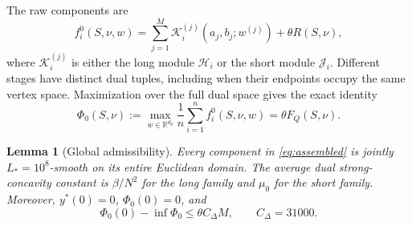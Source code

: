 \documentclass[11pt,letterpaper]{article}
\newtheorem{lemma}[theorem]{Lemma}
\theoremstyle{definition}
\theoremstyle{remark}
\begin{document}
The raw components are
\begin{equation}
 f_i^0(S,\nu,w)
   =\sum_{j=1}^M\mathcal K_i^{(j)}(a_j,b_j;w^{(j)})
       +\theta R(S,\nu),
 \label{eq:assembled}
\end{equation}
where $\mathcal K_i^{(j)}$ is either the long module
$\mathcal H_i$ or the short module $\mathcal J_i$.
Different stages have distinct dual tuples, including when their
endpoints occupy the same vertex space.
Maximization over the full dual space gives the exact identity
\begin{equation}
 \Phi_0(S,\nu)
 :=\max_{w\in\mathbb R^{d_y}}\frac1n\sum_{i=1}^n
                    f_i^0(S,\nu,w)
 =\theta F_Q(S,\nu).
 \label{eq:value-identity}
\end{equation}

\begin{lemma}[Global admissibility]
\label{lem:global-admissibility}
Every component in \eqref{eq:assembled} is jointly
$L_*=10^8$-smooth on its entire Euclidean domain.
The average dual strong-concavity constant is $\beta/N^2$ for the long
family and $\mu_0$ for the short family.
Moreover, $y^*(0)=0$, $\Phi_0(0)=0$, and
\begin{equation}
 \Phi_0(0)-\inf\Phi_0\le\theta C_\Delta M,
 \qquad C_\Delta=31000.
 \label{eq:normalized-gap}
\end{equation}
\end{lemma}
\end{document}
